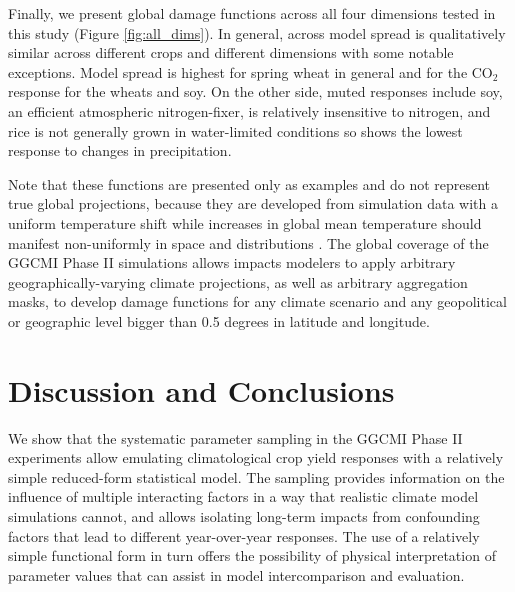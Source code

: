 \documentclass[gmd, manuscript]{copernicus} %
\begin{document}
Finally, we present global damage functions across all four dimensions tested in this study (Figure \ref{fig:all_dims}). 
In general, across model spread is qualitatively similar across different crops and different dimensions with some notable exceptions. 
Model spread is highest for spring wheat in general and for the CO$_2$ response for the wheats and soy.
On the other side, muted responses include soy, an efficient atmospheric nitrogen-fixer, is relatively insensitive to nitrogen, and rice is not generally grown in water-limited conditions so shows the lowest response to changes in precipitation. 

Note that these functions are presented only as examples and do not represent true global projections, because they are developed from simulation data with a uniform temperature shift while increases in global mean temperature should manifest non-uniformly in space and distributions \citep[e.g]{Sippel2015}. 
The global coverage of the GGCMI Phase II simulations allows impacts modelers to apply arbitrary geographically-varying climate projections, as well as arbitrary aggregation masks, to develop damage functions for any climate scenario and any geopolitical or geographic level bigger than 0.5 degrees in latitude and longitude.



\section{Discussion and Conclusions} 
\label{S:5}
We show that the systematic parameter sampling in the GGCMI Phase II experiments allow emulating climatological crop yield responses with a relatively simple reduced-form statistical model. 
The sampling provides information on the influence of multiple interacting factors in a way that realistic climate model simulations cannot, and allows isolating long-term impacts from confounding factors that lead to different year-over-year responses. 
The use of a relatively simple functional form in turn offers the possibility of physical interpretation of parameter values that can assist in model intercomparison and evaluation. 
\end{document}
